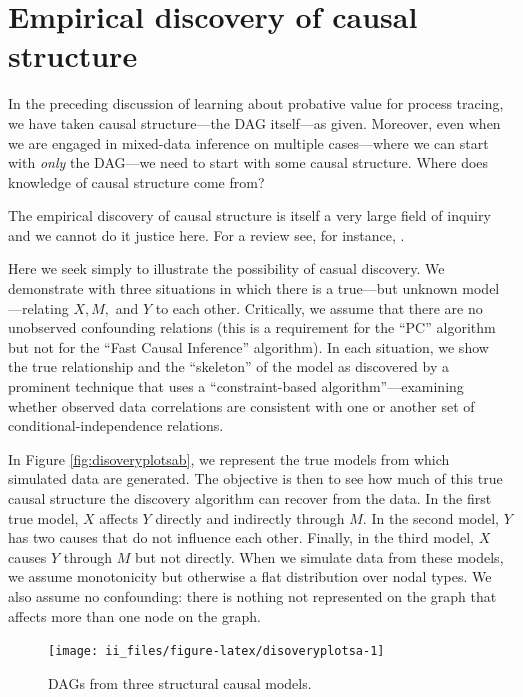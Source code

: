\documentclass[
  12pt,
]{book}
\begin{document}
\hypertarget{empirical-discovery-of-causal-structure}{%
\section{Empirical discovery of causal structure}\label{empirical-discovery-of-causal-structure}}

In the preceding discussion of learning about probative value for process tracing, we have taken causal structure---the DAG itself---as given. Moreover, even when we are engaged in mixed-data inference on multiple cases---where we can start with \emph{only} the DAG---we need to start with some causal structure. Where does knowledge of causal structure come from?

The empirical discovery of causal structure is itself a very large field of inquiry and we cannot do it justice here. For a review see, for instance, \citet{glymour2019review}.

Here we seek simply to illustrate the possibility of casual discovery. We demonstrate with three situations in which there is a true---but unknown model---relating \(X,M,\) and \(Y\) to each other. Critically, we assume that there are no unobserved confounding relations (this is a requirement for the ``PC'' algorithm but not for the ``Fast Causal Inference'' algorithm). In each situation, we show the true relationship and the ``skeleton'' of the model as discovered by a prominent technique that uses a ``constraint-based algorithm''---examining whether observed data correlations are consistent with one or another set of conditional-independence relations.

In Figure \ref{fig:disoveryplotsab}, we represent the true models from which simulated data are generated. The objective is then to see how much of this true causal structure the discovery algorithm can recover from the data. In the first true model, \(X\) affects \(Y\) directly and indirectly through \(M\). In the second model, \(Y\) has two causes that do not influence each other. Finally, in the third model, \(X\) causes \(Y\) through \(M\) but not directly. When we simulate data from these models, we assume monotonicity but otherwise a flat distribution over nodal types. We also assume no confounding: there is nothing not represented on the graph that affects more than one node on the graph.

\begin{figure}

{\centering \texttt{[image: ii\_files/figure-latex/disoveryplotsa-1]} 

}

\caption{DAGs from three structural causal models.}\label{fig:disoveryplotsa}
\end{figure}
\end{document}
